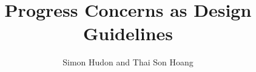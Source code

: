 \newcommand\PREAMBLE{}
{
  \usepackage{fullpage}
  \usepackage{pgf}
  \usepackage{hyperref}
}

{
}

\usepackage[english]{babel}

\usepackage[latin1]{inputenc}
\usepackage{times}
\usepackage[T1]{fontenc}

\usepackage{amsmath}
\usepackage{amssymb}
\usepackage[colour, nobox]{eventB}
\usepackage{bsymb}
\usepackage{spacing}
\usepackage{unitb}
\usepackage{unity}
\usepackage{ltl}
\usepackage[compact]{reqdoc}
\usepackage{reasoning}
\usepackage{tikz}
\usetikzlibrary{snakes,arrows}

\newcommand{\Conv}[2]{\vdash \textsf{$#1$ is convergent in $#2$}}
\newcommand{\Div}[2]{\vdash \textsf{$#1$ is divergent in $#2$}}
\newcommand{\DLF}[2]{\vdash \textsf{$#1$ is deadlock-free in $#2$}}
\newcommand{\LeadsFrom}[3]{\vdash \textsf{$#1$ leads from $#2$ to $#3$}}
\newcommand{\Pred}{P}
\newcommand{\Mch}{\Bmch{M}}

\title[The Unit-B Modelling Method]
{Progress Concerns as Design Guidelines}


\author[S.~Hudon and T.S.~Hoang] %
{Simon Hudon and Thai Son Hoang}

